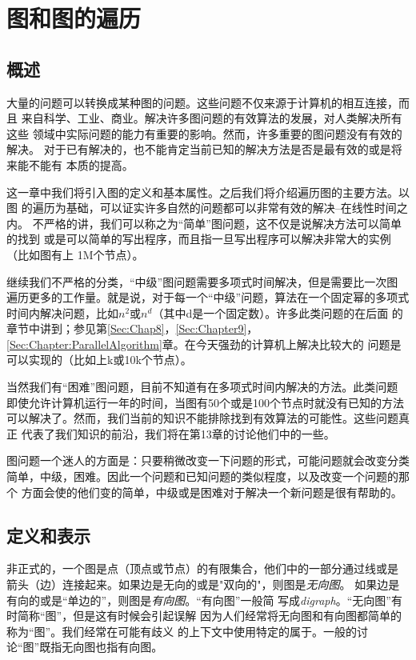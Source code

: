 \chapter{图和图的遍历}
\section{概述}
大量的问题可以转换成某种图的问题。这些问题不仅来源于计算机的相互连接，而且
来自科学、工业、商业。解决许多图问题的有效算法的发展，对人类解决所有这些
领域中实际问题的能力有重要的影响。然而，许多重要的图问题没有有效的解决。
对于已有解决的，也不能肯定当前已知的解决方法是否是最有效的或是将来能不能有
本质的提高。

这一章中我们将引入图的定义和基本属性。之后我们将介绍遍历图的主要方法。以图
的遍历为基础，可以证实许多自然的问题都可以非常有效的解决--在线性时间之内。
不严格的讲，我们可以称之为“简单”图问题，这不仅是说解决方法可以简单的找到
或是可以简单的写出程序，而且指一旦写出程序可以解决非常大的实例（比如图有上
1M个节点）。

继续我们不严格的分类，“中级”图问题需要多项式时间解决，但是需要比一次图
遍历更多的工作量。就是说，对于每一个“中级”问题，算法在一个固定幂的多项式
时间内解决问题，比如$n^2$或$n^d$（其中d是一个固定数）。许多此类问题的在后面
的章节中讲到；参见第\ref{Sec:Chap8}，\ref{Sec:Chapter9}，
\ref{Sec:Chapter:ParallelAlgorithm}章。在今天强劲的计算机上解决比较大的
问题是可以实现的（比如上k或10k个节点）。

当然我们有“困难”图问题，目前不知道有在多项式时间内解决的方法。此类问题
即使允许计算机运行一年的时间，当图有50个或是100个节点时就没有已知的方法
可以解决了。然而，我们当前的知识不能排除找到有效算法的可能性。这些问题真正
代表了我们知识的前沿，我们将在第13章的讨论他们中的一些。

图问题一个迷人的方面是：只要稍微改变一下问题的形式，可能问题就会改变分类
简单，中级，困难。因此一个问题和已知问题的类似程度，以及改变一个问题的那个
方面会使的他们变的简单，中级或是困难对于解决一个新问题是很有帮助的。

\section{定义和表示}\label{Sec:GraphDefinitionsAndRepresentations}
非正式的，一个图是点（顶点或节点）的有限集合，他们中的一部分通过线或是
箭头（边）连接起来。如果边是无向的或是"双向的"，则图是\emph{无向图}。
如果边是有向的或是“单边的”，则图是\emph{有向图}。“有向图”一般简
写成\emph{digraph}。“无向图”有时简称“图”，但是这有时候会引起误解
因为人们经常将无向图和有向图都简单的称为“图”。我们经常在可能有歧义
的上下文中使用特定的属于。一般的讨论“图”既指无向图也指有向图。

